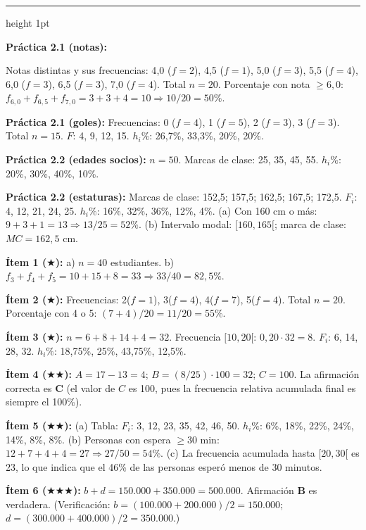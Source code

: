 \documentclass[11pt, letterpaper]{article}
\newcommand{\subbloque}[1]{%
  \vspace{14pt}
  \noindent{\large\bfseries\color{zenitnavy} #1}\par
  \vspace{4pt}\hrule height 1pt\vspace{8pt}}
\begin{document}
\subbloque{Sección 2 --- Tablas de frecuencia}

\textbf{Práctica 2.1 (notas):}

Notas distintas y sus frecuencias: 4{,}0 ($f=2$), 4{,}5 ($f=1$), 5{,}0 ($f=3$), 5{,}5 ($f=4$), 6{,}0 ($f=3$), 6{,}5 ($f=3$), 7{,}0 ($f=4$). Total $n=20$.
Porcentaje con nota $\geq 6{,}0$: $f_{6{,}0}+f_{6{,}5}+f_{7{,}0} = 3+3+4 = 10 \Rightarrow 10/20 = 50\%$.

\textbf{Práctica 2.1 (goles):}
Frecuencias: 0 ($f=4$), 1 ($f=5$), 2 ($f=3$), 3 ($f=3$). Total $n=15$.
$F$: 4, 9, 12, 15. $h_i\%$: 26{,}7\%, 33{,}3\%, 20\%, 20\%.

\textbf{Práctica 2.2 (edades socios):}
$n=50$. Marcas de clase: 25, 35, 45, 55. $h_i\%$: 20\%, 30\%, 40\%, 10\%.

\textbf{Práctica 2.2 (estaturas):}
Marcas de clase: 152{,}5; 157{,}5; 162{,}5; 167{,}5; 172{,}5.
$F_i$: 4, 12, 21, 24, 25. $h_i\%$: 16\%, 32\%, 36\%, 12\%, 4\%.
(a) Con 160 cm o más: $9+3+1=13 \Rightarrow 13/25=52\%$.
(b) Intervalo modal: $[160,165[$; marca de clase: $MC = 162{,}5$ cm.

\textbf{Ítem 1 ($\bigstar$):}
a) $n=40$ estudiantes.
b) $f_3+f_4+f_5 = 10+15+8 = 33 \Rightarrow 33/40 = 82{,}5\%$.

\textbf{Ítem 2 ($\bigstar$):}
Frecuencias: 2($f=1$), 3($f=4$), 4($f=7$), 5($f=4$). Total $n=20$.
Porcentaje con 4 o 5: $(7+4)/20 = 11/20 = 55\%$.

\textbf{Ítem 3 ($\bigstar$):}
$n = 6+8+14+4 = 32$. Frecuencia $[10,20[$: $0{,}20 \cdot 32 = 8$.
$F_i$: 6, 14, 28, 32. $h_i\%$: 18{,}75\%, 25\%, 43{,}75\%, 12{,}5\%.

\textbf{Ítem 4 ($\bigstar\bigstar$):}
$A = 17-13 = 4$; $B = (8/25)\cdot 100 = 32$; $C = 100$.
La afirmación correcta es \textbf{C} (el valor de $C$ es 100, pues la frecuencia relativa acumulada final es siempre el 100\%).

\textbf{Ítem 5 ($\bigstar\bigstar$):}
(a) Tabla: $F_i$: 3, 12, 23, 35, 42, 46, 50. $h_i\%$: 6\%, 18\%, 22\%, 24\%, 14\%, 8\%, 8\%.
(b) Personas con espera $\geq 30$ min: $12+7+4+4=27 \Rightarrow 27/50=54\%$.
(c) La frecuencia acumulada hasta $[20,30[$ es 23, lo que indica que el 46\% de las personas esperó menos de 30 minutos.

\textbf{Ítem 6 ($\bigstar\bigstar\bigstar$):}
$b+d = 150.000+350.000 = 500.000$. Afirmación \textbf{B} es verdadera.
(Verificación: $b = (100.000+200.000)/2 = 150.000$; $d = (300.000+400.000)/2 = 350.000$.)
\end{document}
